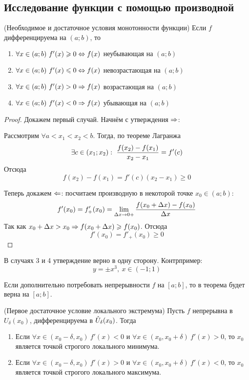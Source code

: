 \subsection{Исследование функции с помощью производной}

\begin{theorem} \label{monoF} (Необходимое и достаточное условия монотонности функции)
	Если $f$ дифференцируема на $(a; b)$, то
	\begin{enumerate}
		\item $\forall x \in (a; b)\  f'(x) \geqslant 0 \Leftrightarrow f(x)$ неубывающая на $(a; b)$
		
		\item $\forall x \in (a; b)\ f'(x) \leqslant 0 \Leftrightarrow f(x)$ невозрастающая на $(a; b)$
		
		\item $\forall x \in (a; b)\  f'(x) > 0 \Rightarrow f(x)$ возрастающая на $(a; b)$
		
		\item $\forall x \in (a; b)\ f'(x) < 0 \Rightarrow f(x)$ убывающая на $(a; b)$
	\end{enumerate}
\end{theorem}

\begin{proof}
	Докажем первый случай. Начнём с утверждения $\Rightarrow$:
	
	Рассмотрим $\forall a < x_1 < x_2 < b$. Тогда, по теореме Лагранжа
	\[
		\exists c \in (x_1; x_2) :\  \frac{f(x_2) - f(x_1)}{x_2 - x_1} = f'(c)
	\]
	Отсюда
	\[
		f(x_2) - f(x_1) = f'(c) (x_2 - x_1) \ge 0
	\]
	
	Теперь докажем $\Leftarrow$: посчитаем производную в некоторой точке $x_0 \in (a; b)$:
	\[
		f'(x_0) = f'_+(x_0) = \lim\limits_{\Delta x \to 0+} \frac{f(x_0 + \Delta x) - f(x_0)}{\Delta x}
	\]
	Так как $x_0 + \Delta x > x_0 \Rightarrow f(x_0 + \Delta x) \geqslant f(x_0)$. Отсюда
	\[
		f'(x_0) = f'_+(x_0) \ge 0
	\]
\end{proof}

\begin{note}
	В случаях 3 и 4 утверждение верно в одну сторону. Контрпример: 
	\[
		y = \pm x^3,\ x \in (-1; 1)
	\]
\end{note}

\begin{note}
	Если дополнительно потребовать непрерывности $f$ на $[a; b]$, то в теорема будет верна на $[a; b]$.
\end{note}

\begin{theorem} (Первое достаточное условие локального экстремума)
	Пусть $f$ непрерывна в $U_\delta(x_0)$, дифференцируема в $\mathring{U}_\delta(x_0)$. Тогда
	\begin{enumerate}
		\item Если $\forall x \in (x_0 - \delta, x_0)\ f'(x) < 0$ и $\forall x \in (x_0, x_0 + \delta)\ f'(x) > 0$, то $x_0$ является точкой строгого локального минимума.
		
		\item Если $\forall x \in (x_0 - \delta, x_0)\ f'(x) > 0$ и $\forall x \in (x_0, x_0 + \delta)\ f'(x) < 0$, то $x_0$ является точкой строгого локального максимума.
	\end{enumerate}
\end{theorem}

